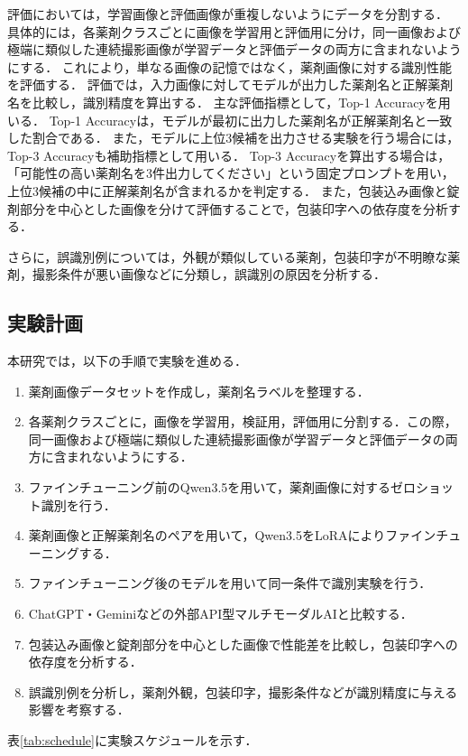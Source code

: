 \documentclass{ltjsarticle}
\begin{document}
評価においては，学習画像と評価画像が重複しないようにデータを分割する．
具体的には，各薬剤クラスごとに画像を学習用と評価用に分け，同一画像および極端に類似した連続撮影画像が学習データと評価データの両方に含まれないようにする．
これにより，単なる画像の記憶ではなく，薬剤画像に対する識別性能を評価する．
評価では，入力画像に対してモデルが出力した薬剤名と正解薬剤名を比較し，識別精度を算出する．
主な評価指標として，Top-1 Accuracyを用いる．
Top-1 Accuracyは，モデルが最初に出力した薬剤名が正解薬剤名と一致した割合である．
また，モデルに上位3候補を出力させる実験を行う場合には，Top-3 Accuracyも補助指標として用いる．
Top-3 Accuracyを算出する場合は，「可能性の高い薬剤名を3件出力してください」という固定プロンプトを用い，上位3候補の中に正解薬剤名が含まれるかを判定する．
また，包装込み画像と錠剤部分を中心とした画像を分けて評価することで，包装印字への依存度を分析する．

さらに，誤識別例については，外観が類似している薬剤，包装印字が不明瞭な薬剤，撮影条件が悪い画像などに分類し，誤識別の原因を分析する．

\subsection{実験計画}

本研究では，以下の手順で実験を進める．

\begin{enumerate}
  \item 薬剤画像データセットを作成し，薬剤名ラベルを整理する．
  \item 各薬剤クラスごとに，画像を学習用，検証用，評価用に分割する．この際，同一画像および極端に類似した連続撮影画像が学習データと評価データの両方に含まれないようにする．
  \item ファインチューニング前のQwen3.5を用いて，薬剤画像に対するゼロショット識別を行う．
  \item 薬剤画像と正解薬剤名のペアを用いて，Qwen3.5をLoRAによりファインチューニングする．
  \item ファインチューニング後のモデルを用いて同一条件で識別実験を行う．
  \item ChatGPT・Geminiなどの外部API型マルチモーダルAIと比較する．
  \item 包装込み画像と錠剤部分を中心とした画像で性能差を比較し，包装印字への依存度を分析する．
  \item 誤識別例を分析し，薬剤外観，包装印字，撮影条件などが識別精度に与える影響を考察する．
\end{enumerate}

表\ref{tab:schedule}に実験スケジュールを示す．
\end{document}
